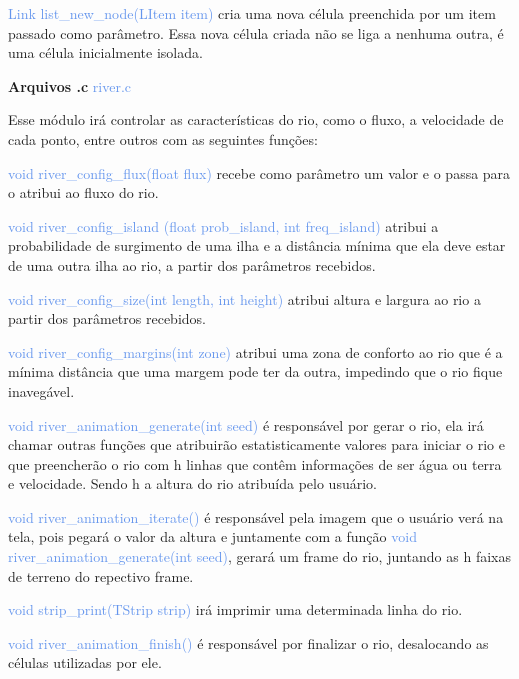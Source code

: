 \documentclass[a4paper,12pt]{article}
\begin{document}
{\textcolor{CornflowerBlue}{Link list\_new\_node(LItem item)}} cria uma nova célula preenchida por um item passado como parâmetro. Essa nova célula criada não se liga a nenhuma outra, é uma célula inicialmente isolada.

\newpage  %

{\Large \textcolor{NavyBlue}{ \textbf{Arquivos .c  }}}{\large \textcolor{CornflowerBlue}{  river.c}}
\bigskip

Esse módulo irá controlar as características do rio, como o fluxo, a velocidade de cada ponto, entre outros com as seguintes funções:

{\textcolor{CornflowerBlue}{void river\_config\_flux(float flux)}} recebe como parâmetro um valor e o passa para o atribui ao fluxo do rio.

{\textcolor{CornflowerBlue}{void river\_config\_island (float prob\_island, int freq\_island)}} atribui a probabilidade de surgimento de uma ilha e a distância mínima que ela deve estar de uma outra ilha ao rio, a partir dos parâmetros recebidos.

{\textcolor{CornflowerBlue}{void river\_config\_size(int length, int height)}} atribui altura e largura ao rio a partir dos parâmetros recebidos. 

{\textcolor{CornflowerBlue}{void river\_config\_margins(int zone)}} atribui uma zona de conforto ao rio que é a mínima distância que uma margem pode ter da outra, impedindo que o rio fique inavegável.

{\textcolor{CornflowerBlue}{void river\_animation\_generate(int seed)}} é responsável por gerar o rio, ela irá chamar outras funções que atribuirão estatisticamente valores para iniciar o rio e que preencherão o rio com h linhas
que contêm informações de ser água ou terra e velocidade. Sendo h a altura do rio atribuída pelo usuário.

{\textcolor{CornflowerBlue}{void river\_animation\_iterate()}} é responsável pela imagem que o usuário verá na tela, pois pegará o valor da altura e juntamente com a função {\textcolor{CornflowerBlue}{void river\_animation\_generate(int seed)}}, gerará um frame do rio, juntando as h faixas de terreno do repectivo frame.

{\textcolor{CornflowerBlue}{void strip\_print(TStrip strip)}} irá imprimir uma determinada linha do rio.

{\textcolor{CornflowerBlue}{void river\_animation\_finish()}} é responsável por finalizar o rio, desalocando as células utilizadas por ele.
\end{document}
